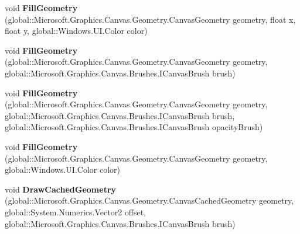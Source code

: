 \begin{DoxyCompactItemize}
\item 
\mbox{\label{interface_microsoft_1_1_graphics_1_1_canvas_1_1_i_canvas_drawing_session_a61fd27d6b54bd2bc5830cd97e2fb1d56}} 
void {\bfseries Fill\+Geometry} (global\+::\+Microsoft.\+Graphics.\+Canvas.\+Geometry.\+Canvas\+Geometry geometry, float x, float y, global\+::\+Windows.\+U\+I.\+Color color)
\item 
\mbox{\label{interface_microsoft_1_1_graphics_1_1_canvas_1_1_i_canvas_drawing_session_a59718abae37d2999f8b8d732bc47b49f}} 
void {\bfseries Fill\+Geometry} (global\+::\+Microsoft.\+Graphics.\+Canvas.\+Geometry.\+Canvas\+Geometry geometry, global\+::\+Microsoft.\+Graphics.\+Canvas.\+Brushes.\+I\+Canvas\+Brush brush)
\item 
\mbox{\label{interface_microsoft_1_1_graphics_1_1_canvas_1_1_i_canvas_drawing_session_aad80be604383ba24523e811f528a8557}} 
void {\bfseries Fill\+Geometry} (global\+::\+Microsoft.\+Graphics.\+Canvas.\+Geometry.\+Canvas\+Geometry geometry, global\+::\+Microsoft.\+Graphics.\+Canvas.\+Brushes.\+I\+Canvas\+Brush brush, global\+::\+Microsoft.\+Graphics.\+Canvas.\+Brushes.\+I\+Canvas\+Brush opacity\+Brush)
\item 
\mbox{\label{interface_microsoft_1_1_graphics_1_1_canvas_1_1_i_canvas_drawing_session_a0ab422e59e3ff023bff47973b32cdc37}} 
void {\bfseries Fill\+Geometry} (global\+::\+Microsoft.\+Graphics.\+Canvas.\+Geometry.\+Canvas\+Geometry geometry, global\+::\+Windows.\+U\+I.\+Color color)
\item 
\mbox{\label{interface_microsoft_1_1_graphics_1_1_canvas_1_1_i_canvas_drawing_session_a418504f456b041d0ddb6925d59602988}} 
void {\bfseries Draw\+Cached\+Geometry} (global\+::\+Microsoft.\+Graphics.\+Canvas.\+Geometry.\+Canvas\+Cached\+Geometry geometry, global\+::\+System.\+Numerics.\+Vector2 offset, global\+::\+Microsoft.\+Graphics.\+Canvas.\+Brushes.\+I\+Canvas\+Brush brush)
\item 
\mbox{\label{interface_microsoft_1_1_graphics_1_1_canvas_1_1_i_canvas_drawing_session_a449b80d289024fe83fd023fd4cc3fcdb}} 

\end{DoxyCompactItemize}
